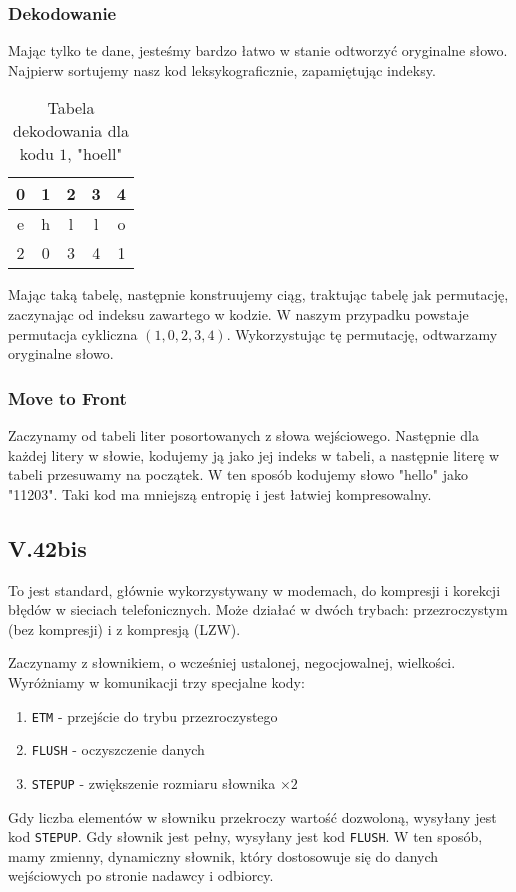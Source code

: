 \documentclass{../notatki}
\begin{document}
\subsubsection{Dekodowanie}

Mając tylko te dane, jesteśmy bardzo łatwo w stanie odtworzyć
oryginalne słowo. Najpierw sortujemy nasz kod leksykograficznie, zapamiętując
indeksy.
\begin{table*}[h]
  \centering
  \begin{tabular}{|c|c|c|c|c|}
    \hline
    \rowcolor{gray!50}
    0 & 1 & 2 & 3 & 4 \\
    \hline
    e & h & l & l & o \\
    \hline
    2 & 0 & 3 & 4 & 1 \\
    \hline
  \end{tabular}
  \caption{Tabela dekodowania dla kodu $1$, "hoell"}
\end{table*}
Mając taką tabelę, następnie konstruujemy ciąg, traktując tabelę jak
permutację, zaczynając od indeksu zawartego w kodzie.
W naszym przypadku powstaje permutacja cykliczna $(1, 0, 2, 3, 4)$.
Wykorzystując tę permutację, odtwarzamy oryginalne słowo.

\subsubsection{Move to Front}

Zaczynamy od tabeli liter posortowanych z słowa wejściowego. Następnie
dla każdej litery w słowie, kodujemy ją jako jej indeks w tabeli, a
następnie literę w tabeli przesuwamy na początek. W ten sposób
kodujemy słowo "hello" jako "11203". Taki kod ma mniejszą entropię i
jest łatwiej kompresowalny.

\subsection{V.42bis}

To jest standard, głównie wykorzystywany w modemach, do kompresji i korekcji
błędów w sieciach telefonicznych. Może działać w dwóch trybach: przezroczystym
(bez kompresji) i z kompresją (LZW).

Zaczynamy z słownikiem, o wcześniej ustalonej, negocjowalnej, wielkości.
Wyróżniamy w komunikacji trzy specjalne kody:
\begin{enumerate}
  \item \texttt{ETM} - przejście do trybu przezroczystego
  \item \texttt{FLUSH} - oczyszczenie danych
  \item \texttt{STEPUP} - zwiększenie rozmiaru słownika $\times 2$
\end{enumerate}
Gdy liczba elementów w słowniku przekroczy wartość dozwoloną, wysyłany jest
kod \texttt{STEPUP}. Gdy słownik jest pełny, wysyłany jest kod \texttt{FLUSH}.
W ten sposób, mamy zmienny, dynamiczny słownik, który dostosowuje się do
danych wejściowych po stronie nadawcy i odbiorcy.
\end{document}
